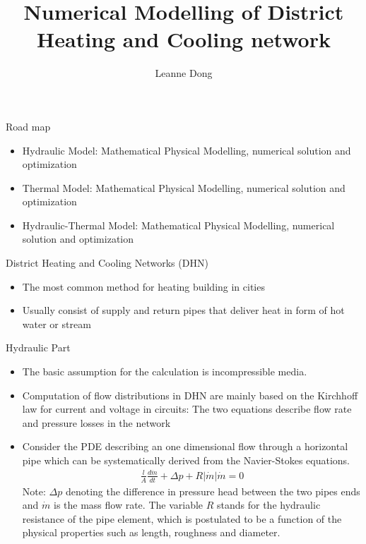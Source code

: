 \documentclass[xcolor=dvipsnames]{beamer}
\title{Numerical Modelling of District Heating and Cooling network}
\author{Leanne Dong}
\begin{document}
\begin{frame}
\titlepage
\end{frame}


\begin{frame}{Road map}
	\begin{itemize}
		\item {\color{purple}Hydraulic} Model: Mathematical Physical Modelling, numerical solution and optimization
		\item {\color{purple}Thermal} Model: Mathematical Physical Modelling, numerical solution and optimization
		\item {\color{purple}Hydraulic-Thermal} Model: Mathematical Physical Modelling, numerical solution and optimization
	\end{itemize}
\end{frame}
\begin{frame}{District Heating and Cooling Networks (DHN)}
\begin{itemize}
	\item The most common method for heating building in cities
	\item Usually consist of supply and return pipes that deliver heat in form of hot water or stream
\end{itemize}
\end{frame}

\begin{frame}{Hydraulic Part}

\begin{itemize}
	\item 	The basic assumption for the calculation is incompressible media.
	\item 	Computation of flow distributions in DHN are mainly based on the Kirchhoff law for {\color{red}current} and {\color{blue}voltage} in circuits: The two equations describe {\color{red}flow rate} and {\color{blue}pressure losses} in the network
	\item 	Consider the PDE describing an one dimensional flow through a horizontal pipe which can be systematically derived from the Navier-Stokes equations.
\begin{align}
	\frac{l}{A}\frac{d\dot{m}}{dt}+\Delta p+R|\dot{m}|\dot{m}=0
\end{align}
Note: $\Delta p$ denoting the difference in pressure head between the two pipes ends and $\dot{m}$ is the mass flow rate. The variable $R$ stands for the hydraulic resistance of the pipe element, which is postulated to be a function of the physical properties such as length, roughness and diameter.
\end{itemize}
\end{frame}
\end{document}

